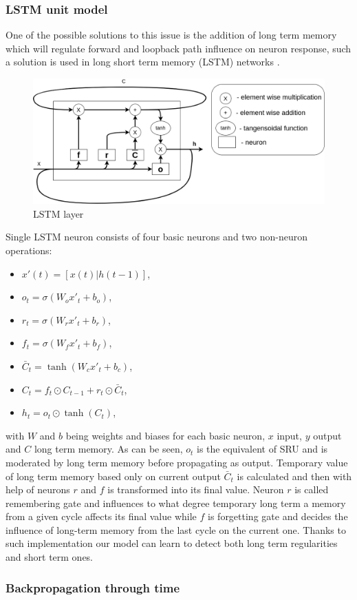 \subsubsection{LSTM unit model}
One of the possible solutions to this issue is the addition of long term memory which will regulate
forward and loopback path influence on neuron response, such a solution is used in long short
term memory (LSTM) networks \cite{Hochreiter1997}.
\begin{figure}[ht] 
	\centering
	\includegraphics[width=\textwidth]{res/lstm}
	\caption{LSTM layer}
	\label{fig:lstm}
\end{figure}
Single LSTM neuron consists of four basic neurons and two non-neuron operations:
\begin{itemize}
	\item $x'(t)=[x(t)|h(t-1)]$,
	\item $o_t=\sigma (W_o x'_t+b_o)$,
	\item $r_t=\sigma (W_r x'_t+b_r)$,
	\item $f_t=\sigma (W_f x'_t+b_f)$,
	\item $\bar{C}_t=\tanh (W_c x'_t+b_c)$,
	\item $C_t=f_t\odot C_{t-1}+r_t\odot \bar{C}_t$,
	\item $h_t=o_t\odot \tanh (C_t)$,
\end{itemize}
with $W$ and $b$ being weights and biases for each basic neuron, $x$ input, $y$ output and
$C$ long term memory. As can be seen, $o_t$ is the equivalent of SRU and is moderated by
long term memory before propagating as output. Temporary value of long term memory based
only on current output $\bar{C}_t$ is calculated and then with help of neurons $r$ and $f$
is transformed into its final value.
Neuron $r$ is called remembering gate and influences to what degree temporary long term
a memory from a given cycle affects its final value while $f$ is forgetting gate and
decides the influence of long-term memory from the last cycle on the current one.
Thanks to such implementation our model can learn to detect both long term regularities and 
short term ones.

\subsubsection{Backpropagation through time}

